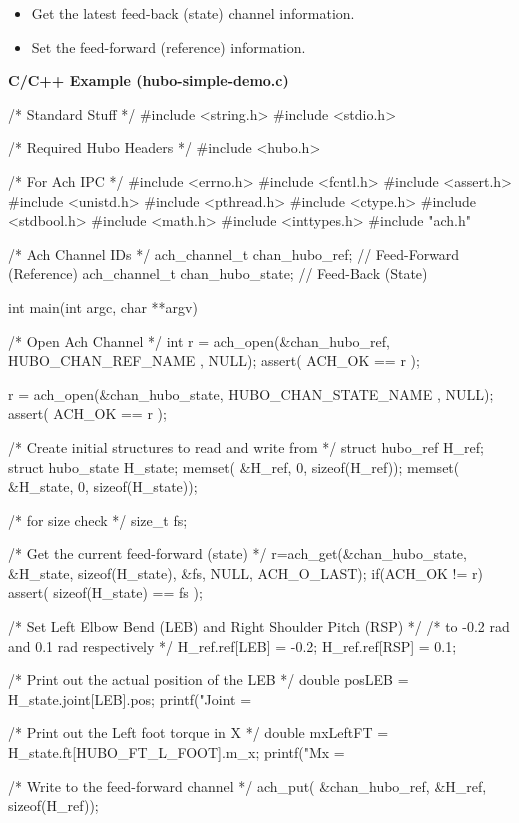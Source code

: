 \begin{itemize}
\item Get the latest feed-back (state) channel information.
\item Set the feed-forward (reference) information.
\end{itemize}


\footnotesize
\noindent \textbf{C/C++ Example (hubo-simple-demo.c)}
\vspace{-6mm}
\begin{code}
/* Standard Stuff */
#include <string.h>
#include <stdio.h>

/* Required Hubo Headers */
#include <hubo.h>

/* For Ach IPC */
#include <errno.h>
#include <fcntl.h>
#include <assert.h>
#include <unistd.h>
#include <pthread.h>
#include <ctype.h>
#include <stdbool.h>
#include <math.h>
#include <inttypes.h>
#include "ach.h"


/* Ach Channel IDs */
ach_channel_t chan_hubo_ref;      // Feed-Forward (Reference)
ach_channel_t chan_hubo_state;    // Feed-Back (State)

int main(int argc, char **argv) {

    /* Open Ach Channel */
    int r = ach_open(&chan_hubo_ref, HUBO_CHAN_REF_NAME , NULL);
    assert( ACH_OK == r );

    r = ach_open(&chan_hubo_state, HUBO_CHAN_STATE_NAME , NULL);
    assert( ACH_OK == r );



    /* Create initial structures to read and write from */
    struct hubo_ref H_ref;
    struct hubo_state H_state;
    memset( &H_ref,   0, sizeof(H_ref));
    memset( &H_state, 0, sizeof(H_state));

    /* for size check */
    size_t fs;

    /* Get the current feed-forward (state) */
    r=ach_get(&chan_hubo_state, &H_state, sizeof(H_state), &fs, NULL, ACH_O_LAST);
    if(ACH_OK != r) {
        assert( sizeof(H_state) == fs );
    }

    /* Set Left Elbow Bend (LEB) and Right Shoulder Pitch (RSP) */
    /* to  -0.2 rad and 0.1 rad respectively */
    H_ref.ref[LEB] = -0.2;
    H_ref.ref[RSP] = 0.1;

    /* Print out the actual position of the LEB */
    double posLEB = H_state.joint[LEB].pos;
    printf("Joint = %

    /* Print out the Left foot torque in X */
    double mxLeftFT = H_state.ft[HUBO_FT_L_FOOT].m_x;
    printf("Mx = %

    /* Write to the feed-forward channel */
    ach_put( &chan_hubo_ref, &H_ref, sizeof(H_ref));

}

\end{code}
\normalsize


